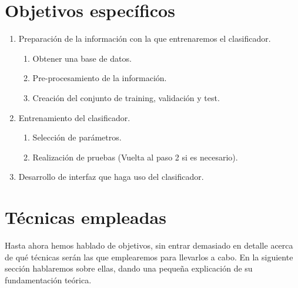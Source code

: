 \documentclass[a4paper,11pt]{book}
\begin{document}
\section{Objetivos específicos}
\begin{enumerate}
	\item Preparación de la información con la que entrenaremos el clasificador.
	\begin{enumerate}
		\item Obtener una base de datos.
		\item Pre-procesamiento de la información.
		\item Creación del conjunto de training, validación y test.
	\end{enumerate}
	\item Entrenamiento del clasificador.
	\begin{enumerate}
		\item Selección de parámetros.
		\item Realización de pruebas (Vuelta al paso 2 si es necesario).
	\end{enumerate}
	\item Desarrollo de interfaz que haga uso del clasificador.
\end{enumerate}

\section{Técnicas empleadas}
\label{sec:tecnicas}
Hasta ahora hemos hablado de objetivos, sin entrar demasiado en detalle acerca de qué técnicas serán las que emplearemos para llevarlos a cabo. En la siguiente sección hablaremos sobre ellas, dando una pequeña explicación de su fundamentación teórica.
\end{document}
